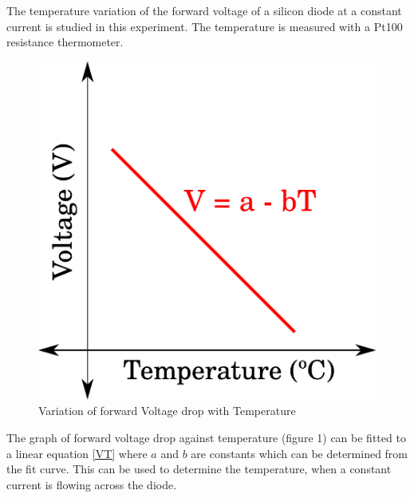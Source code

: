 \documentclass[11pt,a4paper]{article}
\begin{document}
	The temperature variation of the forward voltage of a silicon diode at a constant current is studied in this experiment. The temperature is measured with a Pt100 resistance thermometer.
	
	\begin{figure}[!htb]
		\centering
		\includegraphics[scale=0.6]{VT}
		\caption{Variation of forward Voltage drop with Temperature}
	\end{figure}
	
	The graph of forward voltage drop against temperature (figure 1) can be fitted to a linear equation \ref{VT} where $a$ and $b$ are constants which can be determined from the fit curve.
	This can be used to determine the temperature, when a constant current is flowing across the diode.
\end{document}
